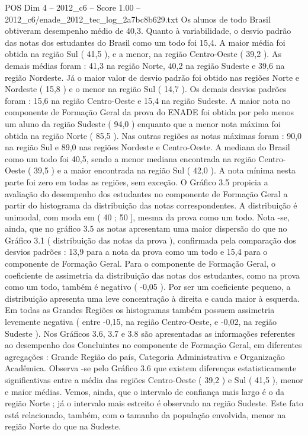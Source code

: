 \begin{textsample}{POS Dim 4 – 2012\_c6 – Score 1.00 – 2012\_c6/enade\_2012\_tec\_log\_2a7bc8b629.txt}
Os alunos de todo Brasil obtiveram desempenho médio de 40,3.
Quanto à variabilidade, o desvio padrão das notas dos estudantes do Brasil como um todo foi 15,4.
A maior média foi obtida na região Sul ( 41,5 ), e a menor, na região Centro-Oeste ( 39,2 ).
As demais médias foram : 41,3 na região Norte, 40,2 na região Sudeste e 39,6 na região Nordeste.
Já o maior valor de desvio padrão foi obtido nas regiões Norte e Nordeste ( 15,8 ) e o menor na região Sul ( 14,7 ).
Os demais desvios padrões foram : 15,6 na região Centro-Oeste e 15,4 na região Sudeste.
A maior nota no componente de Formação Geral da prova do ENADE foi obtida por pelo menos um aluno da região Sudeste ( 94,0 ) enquanto que a menor nota máxima foi obtida na região Norte ( 85,5 ).
Nas outras regiões as notas máximas foram : 90,0 na região Sul e 89,0 nas regiões Nordeste e Centro-Oeste.
A mediana do Brasil como um todo foi 40,5, sendo a menor mediana encontrada na região Centro-Oeste ( 39,5 ) e a maior encontrada na região Sul ( 42,0 ).
A nota mínima nesta parte foi zero em todas as regiões, sem exceção.
O Gráfico 3.5 propicia a avaliação do desempenho dos estudantes no componente de Formação Geral a partir do histograma da distribuição das notas correspondentes.
A distribuição é unimodal, com moda em ( 40 ; 50 ], mesma da prova como um todo.
Nota -se, ainda, que no gráfico 3.5 as notas apresentam uma maior dispersão do que no Gráfico 3.1 ( distribuição das notas da prova ), confirmada pela comparação dos desvios padrões : 13,9 para a nota da prova como um todo e 15,4 para o componente de Formação Geral.
Para o componente de Formação Geral, o coeficiente de assimetria da distribuição das notas dos estudantes, como na prova como um todo, também é negativo ( -0,05 ).
Por ser um coeficiente pequeno, a distribuição apresenta uma leve concentração à direita e cauda maior à esquerda.
Em todas as Grandes Regiões os histogramas também possuem assimetria levemente negativa ( entre -0,15, na região Centro-Oeste, e -0,02, na região Sudeste ).
Nos Gráficos 3.6, 3.7 e 3.8 são apresentadas as informações referentes ao desempenho dos Concluintes no componente de Formação Geral, em diferentes agregações : Grande Região do país, Categoria Administrativa e Organização Acadêmica.
Observa -se pelo Gráfico 3.6 que existem diferenças estatisticamente significativas entre a média das regiões Centro-Oeste ( 39,2 ) e Sul ( 41,5 ), menor e maior médias.
Vemos, ainda, que o intervalo de confiança mais largo é o da região Norte ; já o intervalo mais estreito é observado na região Sudeste.
Este fato está relacionado, também, com o tamanho da população envolvida, menor na região Norte do que na Sudeste.

\end{textsample}
